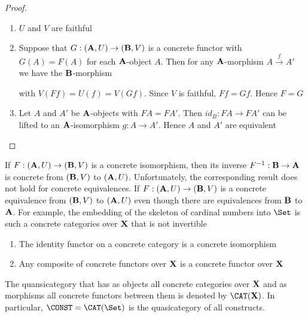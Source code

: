 \documentclass[11pt]{article}
\begin{document}
\begin{proof}
\begin{enumerate}
\item \(U\) and \(V\) are faithful
\item Suppose that \(G:(\operatorname{\textbf{A}},U)\to(\operatorname{\textbf{B}},V)\) is a concrete functor with
\(G(A)=F(A)\) for each \(\operatorname{\textbf{A}}\)-object \(A\). Then for any \(\operatorname{\textbf{A}}\)-morphism
\(A\xrightarrow{f}A'\) we have the \(\operatorname{\textbf{B}}\)-morphism
\begin{center}\end{center}
with \(V(Ff)=U(f)=V(Gf)\). Since \(V\) is faithful, \(Ff=Gf\). Hence \(F=G\)
\item Let \(A\)  and \(A'\) be \(\operatorname{\textbf{A}}\)-objects with \(FA=FA'\). Then
\(id_B:FA\to FA'\) can be lifted to an \(\operatorname{\textbf{A}}\)-isomorphism \(g:A\to A'\).
Hence \(A\) and \(A'\) are equivalent
\end{enumerate}
\end{proof}

\begin{remark}
If \(F:(\operatorname{\textbf{A}},U)\to(\operatorname{\textbf{B}},V)\) is a concrete isomorphism, then its inverse
\(F^{-1}:\operatorname{\textbf{B}}\to\operatorname{\textbf{A}}\) is concrete from \((\operatorname{\textbf{B}},V)\) to \((\operatorname{\textbf{A}},U)\).
Unfortunately, the corresponding result does not hold for concrete
equivalences. If \(F:(\operatorname{\textbf{A}},U)\to(\operatorname{\textbf{B}},V)\) is a concrete equivalence from
\((\operatorname{\textbf{B}},V)\) to \((\operatorname{\textbf{A}},U)\) even though there are equivalences from \(\operatorname{\textbf{B}}\) to
\(\operatorname{\textbf{A}}\). For example, the embedding of the skeleton of cardinal numbers into
\(\Set\) is such a concrete categories over \(\operatorname{\textbf{X}}\) that is not invertible
\end{remark}

\begin{proposition}[]
\begin{enumerate}
\item The identity functor on a concrete category is a concrete isomorphism
\item Any composite of concrete functors over \(\operatorname{\textbf{X}}\) is a concrete functor over \(\operatorname{\textbf{X}}\)
\end{enumerate}
\end{proposition}

\begin{definition}[]
The quansicategory that has as objects all concrete categories over \(\operatorname{\textbf{X}}\)
and as morphisms all concrete functors between them is denoted by
\(\CAT(\bX)\). In particular, \(\CONST=\CAT(\Set)\) is the quasicategory of
all constructs.
\end{definition}
\end{document}
